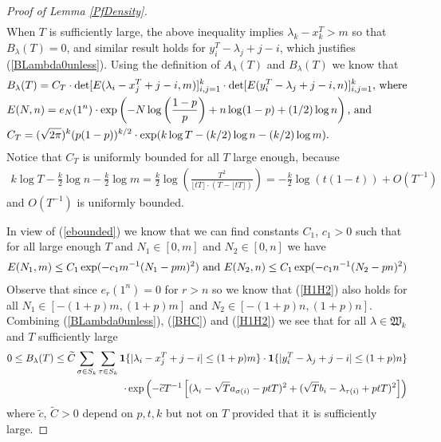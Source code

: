 \begin{proof}[Proof of Lemma \ref{PfDensity}]
\begin{equation*}
\begin{split}
	\end{split}
\end{equation*}
When $T$ is sufficiently large, the above inequality implies $\lambda_{k}-x_k^T>m$ so that $B_{\lambda}(T)=0$, and similar result holds for $y_{i}^T-\lambda_{j}+j-i$, which justifies (\ref{BLambda0unless}). Using the definition of $A_{\lambda}(T)$ and $B_{\lambda}(T)$ we know that
\begin{equation}{\label{BHC}}
	\begin{split}
		& B_{\lambda}(T)=C_{T}\cdot \det[E(\lambda_i-x_j^{T}+j-i,m)]_{i,j=1}^{k}\cdot\det[E(y_i^{T}-\lambda_j+j-i,n)]_{i,j=1}^{k}\text{, where}\\
		& E(N,n)=e_{N}(1^n)\cdot\exp\left(-N\log\left(\frac{1-p}{p}\right)+n\log(1-p)+(1/2)\log n\right)\text{, and}\\
		& C_T=(\sqrt{2\pi})^k (p(1-p))^{k/2}\cdot\exp(k\log T-(k/2)\log n-(k/2)\log m).
	\end{split}
\end{equation}
Notice that $C_{T}$ is uniformly bounded for all $T$ large enough, because
\begin{equation}
\begin{split}
	k\log T-\frac{k}{2}\log n-\frac{k}{2}\log m=\frac{k}{2}\log\left(\frac{T^2}{\lfloor tT \rfloor \cdot (T-\lfloor tT \rfloor)}\right)=-\frac{k}{2}\log(t(1-t))+O\left(T^{-1}\right)
\end{split}
\end{equation}
and $O\left(T^{-1}\right)$ is uniformly bounded.

In view of (\ref{ebounded}) we know that we can find constants $C_1$, $c_1>0$ such that for all large enough $T$ and $N_{1}\in[0,m]$ and $N_2\in[0,n]$ we have 
\begin{equation}{\label{H1H2}}
	\begin{split}
		E(N_1,m)\leq C_1\exp(-c_1 m^{-1}(N_1-pm)^2) \text{ and } E(N_2,n)\leq C_1\exp(-c_1 n^{-1}(N_2-pn)^2)
	\end{split}
\end{equation}
Observe that since $e_{r}(1^{n})=0$ for $r>n$ so we know that (\ref{H1H2}) also holds for all $N_1\in[-(1+p)m,(1+p)m]$ and $N_2\in[-(1+p)n,(1+p)n]$. Combining (\ref{BLambda0unless}), (\ref{BHC}) and (\ref{H1H2}) we see that for all $\lambda\in\mathfrak{W}_k$ and $T$ sufficiently large
\begin{equation}{\label{BLambdaBounded}}
	\begin{split}
		0\leq B_{\lambda}(T)\leq \widetilde{C}\sum_{\sigma\in S_{k}}\sum_{\tau\in S_{k}}\mathbf{1}\{|\lambda_i-x_j^{T}+j-i|\leq(1+p)m\}\cdot\mathbf{1}\{|y_{i}^{T}-\lambda_{j}+j-i|\leq(1+p)n\}\\
		\cdot \exp\left(-\widetilde{c}T^{-1}\left[(\lambda_i-\sqrt{T}a_{\sigma(i)}-ptT)^2+(\sqrt{T}b_{i}-\lambda_{\tau(i)}+ptT)^2\right]\right)
	\end{split}
\end{equation}
where $\widetilde{c}$, $\widetilde{C}>0$ depend on $p,t,k$ but not on $T$ provided that it is sufficiently large.


\end{proof}
